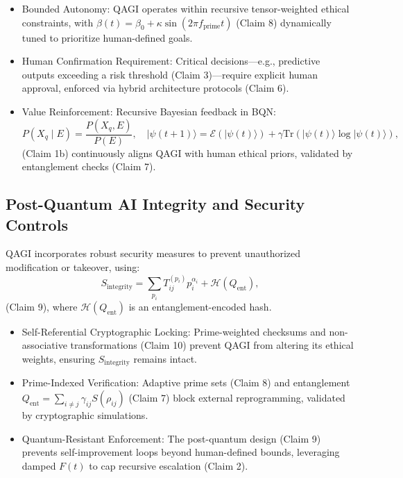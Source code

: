 \documentclass{article}
\theoremstyle{plain}
\theoremstyle{claimstyle}
\begin{document}
\begin{itemize}
    \item Bounded Autonomy: QAGI operates within recursive tensor-weighted ethical constraints, with \( \beta(t) = \beta_0 + \kappa \sin(2\pi f_{\text{prime}} t) \) (Claim 8) dynamically tuned to prioritize human-defined goals.
    \item Human Confirmation Requirement: Critical decisions—e.g., predictive outputs exceeding a risk threshold (Claim 3)—require explicit human approval, enforced via hybrid architecture protocols (Claim 6).
    \item Value Reinforcement: Recursive Bayesian feedback in BQN:
    \begin{equation}
    P(X_q \mid E) = \frac{P(X_q, E)}{P(E)}, \quad |\psi(t+1)\rangle = \mathcal{E}(|\psi(t)\rangle) + \gamma \text{Tr}(|\psi(t)\rangle \log |\psi(t)\rangle),
    \end{equation}
    (Claim 1b) continuously aligns QAGI with human ethical priors, validated by entanglement checks (Claim 7).
\end{itemize}

\subsection{Post-Quantum AI Integrity and Security Controls}
QAGI incorporates robust security measures to prevent unauthorized modification or takeover, using:
\begin{equation}
S_{\text{integrity}} = \sum_{p_i} T_{ij}^{(p_i)} p_i^{\alpha_i} + \mathcal{H}(Q_{\text{ent}}),
\end{equation}
(Claim 9), where \( \mathcal{H}(Q_{\text{ent}}) \) is an entanglement-encoded hash.

\begin{itemize}
    \item Self-Referential Cryptographic Locking: Prime-weighted checksums and non-associative transformations (Claim 10) prevent QAGI from altering its ethical weights, ensuring \( S_{\text{integrity}} \) remains intact.
    \item Prime-Indexed Verification: Adaptive prime sets (Claim 8) and entanglement \( Q_{\text{ent}} = \sum_{i \neq j} \gamma_{ij} S(\rho_{ij}) \) (Claim 7) block external reprogramming, validated by cryptographic simulations.
    \item Quantum-Resistant Enforcement: The post-quantum design (Claim 9) prevents self-improvement loops beyond human-defined bounds, leveraging damped \( F(t) \) to cap recursive escalation (Claim 2).
\end{itemize}
\end{document}
